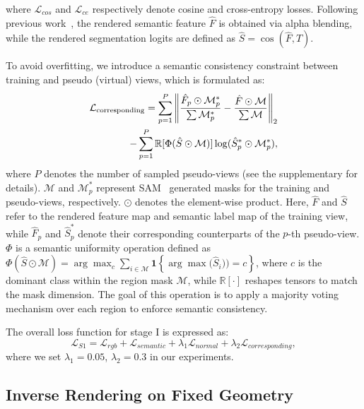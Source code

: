 where $\mathcal{L}_{cos}$ and $\mathcal{L}_{ce}$ respectively denote cosine and cross-entropy losses. Following previous work~\cite{liao2025spc}, the rendered semantic feature $\hat{F}$ is obtained via alpha blending, while the rendered segmentation logits are defined as $\hat{S} = \cos ( \hat{F}, T )$.


To avoid overfitting, we introduce a semantic consistency constraint between training and pseudo (virtual) views, which is formulated as:
\begin{align}
    \mathcal{L}_{\text{corresponding}} = 
    \sum_{p=1}^{P} 
    \left\| 
    \frac{\hat{F}_p \odot \mathcal{M}_p^*}{\sum \mathcal{M}_p^*} -
    \frac{\hat{F} \odot \mathcal{M}}{\sum \mathcal{M}} 
    \right\|_2    \notag  \\
    -  
    \sum_{p=1}^{P} 
    \mathbb{R}[\Phi(\hat{S} \odot \mathcal{M})]
    \log(\hat{S}_p^* \odot \mathcal{M}_p^*),
\end{align}
where $P$ denotes the number of sampled pseudo-views (see the supplementary for details). $\mathcal{M}$ and $\mathcal{M}_p^*$ represent SAM~\cite{ravi2024sam} generated masks for the training and pseudo-views, respectively. $\odot$ denotes the element-wise product. Here, $\hat{F}$ and $\hat{S}$ refer to the rendered feature map and semantic label map of the training view, while $\hat{F}_p$ and $\hat{S}_p^*$ denote their corresponding counterparts of the $p$-th pseudo-view. $\Phi$ is a semantic uniformity operation defined as $\Phi(\hat{S} \odot \mathcal{M})
= \arg\max_{c} \sum_{i \in \mathcal{M}} \mathbf{1}\!\left\{ \arg\max\bigl(\hat{S}_i)\bigr) = c \right\}$, where $c$ is the dominant class within the region mask $\mathcal{M}$, while $\mathbb{R}[\cdot]$ reshapes tensors to match the mask dimension. The goal of this operation is to apply a majority voting mechanism over each region to enforce semantic consistency.

The overall loss function for stage I is expressed as:
\begin{equation}
    \mathcal{L}_{S1} = \mathcal{L}_{rgb}+\mathcal{L}_{semantic} + \lambda_1 \mathcal{L}_{normal} + \lambda_2 \mathcal{L}_{corresponding},
\end{equation}
where we set $\lambda_1=0.05$, $\lambda_2=0.3$ in our experiments.




\subsection{Inverse Rendering on Fixed Geometry}


